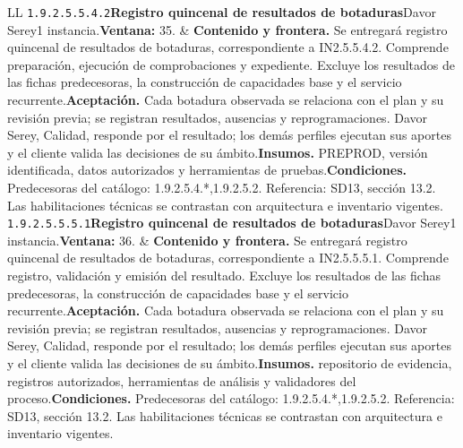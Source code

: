 \begin{longtable}{L{\tabcolsep\relax}L{\tabcolsep\relax}}
\texttt{1.\allowbreak{}9.\allowbreak{}2.\allowbreak{}5.\allowbreak{}5.\allowbreak{}4.\allowbreak{}2}\newline{}\textbf{Registro quincenal de resultados de botaduras}\newline{}Davor Serey\newline{}1 instancia.\newline{}\textbf{Ventana:} 35. & \textbf{Contenido y frontera.} Se entregará registro quincenal de resultados de botaduras, correspondiente a IN2.5.5.4.2. Comprende preparación, ejecución de comprobaciones y expediente. Excluye los resultados de las fichas predecesoras, la construcción de capacidades base y el servicio recurrente.\newline{}\textbf{Aceptación.} Cada botadura observada se relaciona con el plan y su revisión previa; se registran resultados, ausencias y reprogramaciones. Davor Serey, Calidad, responde por el resultado; los demás perfiles ejecutan sus aportes y el cliente valida las decisiones de su ámbito.\newline{}\textbf{Insumos.} PREPROD, versión identificada, datos autorizados y herramientas de pruebas.\newline{}\textbf{Condiciones.} Predecesoras del catálogo: 1.9.2.5.4.*,1.9.2.5.2. Referencia: SD13, sección 13.2. Las habilitaciones técnicas se contrastan con arquitectura e inventario vigentes.\\\hline
\texttt{1.\allowbreak{}9.\allowbreak{}2.\allowbreak{}5.\allowbreak{}5.\allowbreak{}5.\allowbreak{}1}\newline{}\textbf{Registro quincenal de resultados de botaduras}\newline{}Davor Serey\newline{}1 instancia.\newline{}\textbf{Ventana:} 36. & \textbf{Contenido y frontera.} Se entregará registro quincenal de resultados de botaduras, correspondiente a IN2.5.5.5.1. Comprende registro, validación y emisión del resultado. Excluye los resultados de las fichas predecesoras, la construcción de capacidades base y el servicio recurrente.\newline{}\textbf{Aceptación.} Cada botadura observada se relaciona con el plan y su revisión previa; se registran resultados, ausencias y reprogramaciones. Davor Serey, Calidad, responde por el resultado; los demás perfiles ejecutan sus aportes y el cliente valida las decisiones de su ámbito.\newline{}\textbf{Insumos.} repositorio de evidencia, registros autorizados, herramientas de análisis y validadores del proceso.\newline{}\textbf{Condiciones.} Predecesoras del catálogo: 1.9.2.5.4.*,1.9.2.5.2. Referencia: SD13, sección 13.2. Las habilitaciones técnicas se contrastan con arquitectura e inventario vigentes.\\\hline

\end{longtable}

